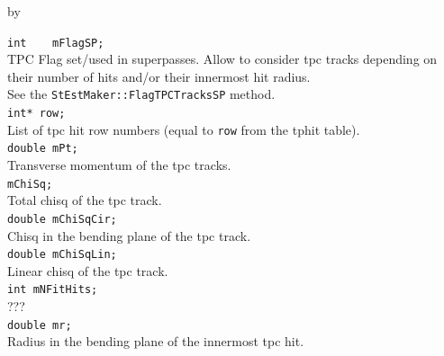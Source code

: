 \documentclass[twoside]{article}
\newcommand{\entrylabel}[1]{\mbox{\textbf{{#1}}}\hfil}%
\newenvironment{entry}
{\begin{list}{}%
    {\renewcommand{\makelabel}{\entrylabel}%
     \setlength{\labelwidth}{90pt}%
     \setlength{\leftmargin}{\labelwidth}
     \advance\leftmargin by \labelsep%
      }%
    }%
  {\end{list}}
\newcommand{\Entrylabel}[1]%
{\raisebox{0pt}[1ex][0pt]{\makebox[\labelwidth][l]%
    {\parbox[t]{\labelwidth}{\hspace{0pt}\textbf{{#1}}}}}}
\newenvironment{Entry}%
{\renewcommand{\entrylabel}{\Entrylabel}\begin{entry}}%
  {\end{entry}}
\begin{document}
\begin{Entry}
	\verb+int    mFlagSP;+\\
	TPC Flag set/used in superpasses. Allow to consider tpc tracks depending on their number of hits and/or their innermost hit radius. \\
	See the \verb+StEstMaker::FlagTPCTracksSP+ method.\\  
	\verb+int* row;+\\
	List of tpc hit row numbers (equal to \verb+row+ from the tphit table).\\ 
	\verb+double mPt;+\\
	Transverse momentum of the tpc tracks.\\
	\verb+mChiSq;+\\ 
	Total chisq of the tpc track.\\
	\verb+double mChiSqCir;+\\
	Chisq in the bending plane of the tpc track.\\	
	\verb+double mChiSqLin;+\\
	Linear chisq of the tpc track.\\
	\verb+int mNFitHits;+\\
	???\\
	\verb+double mr;+\\
	Radius in the bending plane of the innermost tpc hit.\\
	 

\end{Entry}
\end{document}
